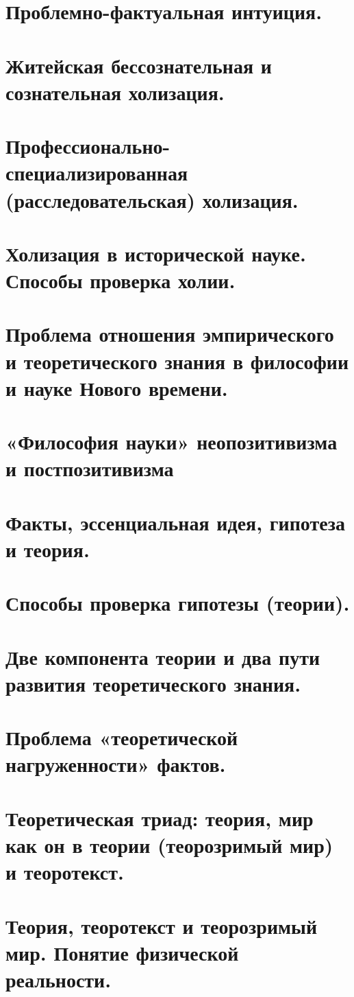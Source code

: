 \section{ Проблемно-фактуальная интуиция.}
\section{ Житейская бессознательная и сознательная холизация. }
\section{ Профессионально-специализированная (расследовательская) холизация.}
\section{ Холизация в исторической науке. Способы проверка холии.}
\section{ Проблема отношения эмпирического и теоретического знания в философии и науке Нового времени.}
\section{ «Философия науки» неопозитивизма и постпозитивизма }
\section{ Факты, эссенциальная идея, гипотеза и теория.}
\section{ Способы проверка гипотезы (теории).}
\section{ Две компонента теории и два пути развития теоретического знания.}
\section{ Проблема «теоретической нагруженности» фактов.}
\section{ Теоретическая триад: теория, мир как он в теории (теорозримый мир) и теоротекст.}
\section{ Теория, теоротекст и теорозримый мир. Понятие физической реальности.}
